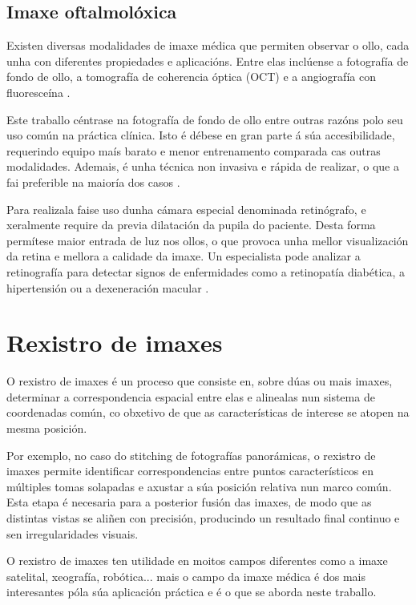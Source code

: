 \subsection{Imaxe oftalmolóxica}
\label{subsec:Imaxe oftalmolóxica}
Existen diversas modalidades de imaxe médica que permiten observar o ollo, cada unha con diferentes propiedades e aplicacións. 
Entre elas inclúense a fotografía de fondo de ollo, a tomografía de coherencia óptica (OCT) e a angiografía con fluoresceína \cite{ilginis2014ophthalmic}.

Este traballo céntrase na fotografía de fondo de ollo entre outras razóns polo seu uso común na práctica clínica.
Isto é débese en gran parte á súa accesibilidade, requerindo equipo maís barato e menor entrenamento comparada cas outras modalidades. 
Ademais, é unha técnica non invasiva e rápida de realizar, o que a fai preferible na maioría dos casos \cite{retinimaging}.

Para realizala faise uso dunha cámara especial denominada retinógrafo, e xeralmente require da previa dilatación da pupila do paciente.
Desta forma permítese maior entrada de luz nos ollos, o que provoca unha mellor visualización da retina e mellora a calidade da imaxe.
Un especialista pode analizar a retinografía para detectar signos de enfermidades como a retinopatía diabética, a hipertensión ou a dexeneración macular \cite{retreggood}.

\section{Rexistro de imaxes}
\label{sec:Rexistro de imaxes}
O rexistro de imaxes é un proceso que consiste en, sobre dúas ou mais imaxes, determinar a correspondencia espacial entre elas
 e alinealas nun sistema de coordenadas común, co obxetivo de que as características de interese se atopen na mesma posición.

 Por exemplo, no caso do stitching de fotografías panorámicas, o rexistro de imaxes permite identificar correspondencias entre puntos característicos en múltiples tomas solapadas
  e axustar a súa posición relativa nun marco común. Esta etapa é necesaria para a posterior fusión das imaxes, de modo que as distintas vistas se aliñen con precisión, producindo un resultado final continuo e sen irregularidades visuais.

O rexistro de imaxes ten utilidade en moitos campos diferentes como a imaxe satelital, xeografía, robótica... \cite{goshtasby2017theory} mais o 
campo da imaxe médica é dos mais interesantes póla súa aplicación práctica e é o que se aborda neste traballo.

